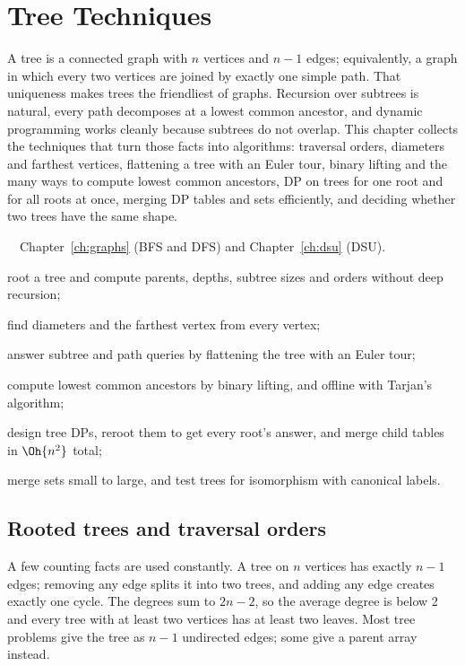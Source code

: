 \chapter{Tree Techniques}\label{ch:trees}

A tree is a connected graph with $n$ vertices and $n - 1$ edges; equivalently, a graph in which every two vertices are joined
by exactly one simple path. That uniqueness makes trees the friendliest of graphs. Recursion over subtrees is natural, every
path decomposes at a lowest common ancestor, and dynamic programming works cleanly because subtrees do not overlap. This
chapter collects the techniques that turn those facts into algorithms: traversal orders, diameters and farthest vertices,
flattening a tree with an Euler tour, binary lifting and the many ways to compute lowest common ancestors, DP on trees for one
root and for all roots at once, merging DP tables and sets efficiently, and deciding whether two trees have the same shape.

\begin{chapterintro}{\silver\ \gold\ \plat}{Chapter~\ref{ch:graphs} (BFS and DFS) and Chapter~\ref{ch:dsu} (DSU).}
  \item root a tree and compute parents, depths, subtree sizes and orders without deep recursion;
  \item find diameters and the farthest vertex from every vertex;
  \item answer subtree and path queries by flattening the tree with an Euler tour;
  \item compute lowest common ancestors by binary lifting, and offline with Tarjan's algorithm;
  \item design tree DPs, reroot them to get every root's answer, and merge child tables in $\Oh{n^2}$ total;
  \item merge sets small to large, and test trees for isomorphism with canonical labels.
\end{chapterintro}

\section[Rooted trees]{Rooted trees and traversal orders \hfill \silver}\label{sec:rooted}

A few counting facts are used constantly. A tree on $n$ vertices has exactly $n - 1$ edges; removing any edge splits it into two
trees, and adding any edge creates exactly one cycle. The degrees sum to $2n - 2$, so the average degree is below 2 and every tree
with at least two vertices has at least two leaves. Most tree problems give the tree as $n - 1$ undirected edges; some give a
parent array instead.

